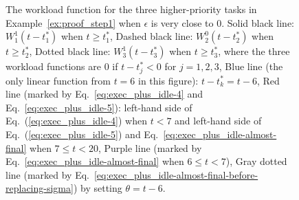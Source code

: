 \begin{figure}[t]
{    }
  \caption{\small The workload function for the three higher-priority tasks in Example~\ref{ex:proof_step1} when $\epsilon$ is very close to $0$. Solid black line: $W_1^1(t-t_1^*)$ when $t \geq t_1^*$, Dashed black line: $W_2^0(t-t_2^*)$ when $t \geq t_2^*$, Dotted black line: $W_3^1(t-t_3^*)$ when $t \geq t_3^*$, where the three workload functions are $0$ if $t-t_j^* < 0$ for $j=1,2,3$, Blue line (the only linear function from $t=6$ in this figure): $t-t_k^*=t-6$, Red line (marked by Eq.~\eqref{eq:exec_plus_idle-4} and Eq.~\eqref{eq:exec_plus_idle-5}): left-hand side of Eq.~(\ref{eq:exec_plus_idle-4}) when $t < 7$ and left-hand side of Eq.~(\ref{eq:exec_plus_idle-5}) and Eq.~\eqref{eq:exec_plus_idle-almost-final} when $ 7 \leq t < 20$, Purple line (marked by Eq.~\eqref{eq:exec_plus_idle-almost-final} when $6 \leq t < 7$), Gray dotted line (marked by Eq.~\eqref{eq:exec_plus_idle-almost-final-before-replacing-sigma}) by setting $\theta=t-6$.}
  \label{fig:example-proof-final}
\end{figure}



